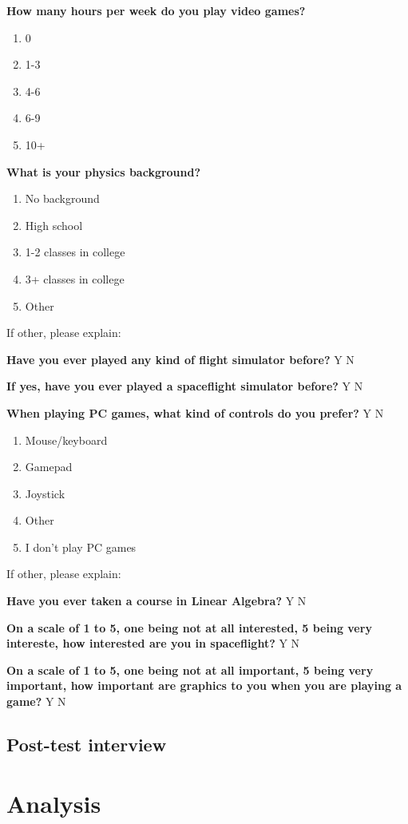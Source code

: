 \vspace{5mm}
\noindent\textbf{How many hours per week do you play video games?}
\begin{enumerate}
  \item 0
  \item 1-3
  \item 4-6
  \item 6-9
  \item 10+
\end{enumerate}

\vspace{5mm}
\noindent\textbf{What is your physics background?}
\begin{enumerate}
  \item No background
  \item High school
  \item 1-2 classes in college
  \item 3+ classes in college
  \item Other
\end{enumerate}
If other, please explain:

\vspace{5mm}
\noindent\textbf{Have you ever played any kind of flight simulator before?} Y N

\vspace{5mm}
\noindent\textbf{If yes, have you ever played a spaceflight simulator before?} Y N

\vspace{5mm}
\noindent\textbf{When playing PC games, what kind of controls do you prefer?} Y N
\begin{enumerate}
  \item Mouse/keyboard
  \item Gamepad
  \item Joystick
  \item Other
  \item I don’t play PC games
\end{enumerate}
If other, please explain:

\vspace{5mm}
\noindent\textbf{Have you ever taken a course in Linear Algebra?} Y N

\vspace{5mm}
\noindent\textbf{On a scale of 1 to 5, one being not at all interested, 5 being very intereste, how interested are you in spaceflight?} Y N

\vspace{5mm}
\noindent\textbf{On a scale of 1 to 5, one being not at all important, 5 being very important, how important are graphics to you when you are playing a game?} Y N

\subsection{Post-test interview}

\section{Analysis}





